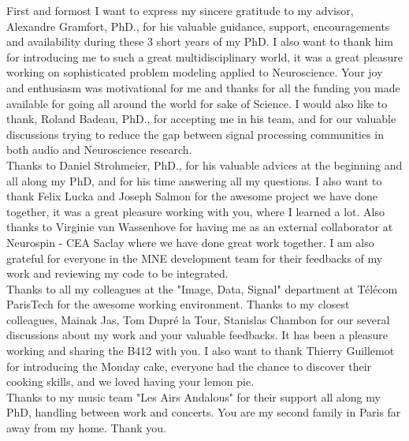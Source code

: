 
\begin{acknowledgements}
\addchaptertocentry{\acknowledgementname} %

\vspace{20pt}
First and formost I want to express my sincere gratitude to my advisor, Alexandre Gramfort, PhD., for his valuable guidance, support, encouragements and availability during these 3 short years of my PhD. I also want to thank him for introducing me to such a great multidisciplinary world, it was a great pleasure working on sophisticated problem modeling applied to Neuroscience. Your joy and enthusiasm was motivational for me and thanks for all the funding you made available for going all around the world for sake of Science. I would also like to thank, Roland Badeau, PhD., for accepting me in his team, and for our valuable discussions trying to reduce the gap between signal processing communities in both audio and Neuroscience research.\\

Thanks to Daniel Strohmeier, PhD., for his valuable advices at the beginning and all along my PhD, and for his time answering all my questions. I also want to thank Felix Lucka and Joseph Salmon for the awesome project we have done together, it was a great pleasure working with you, where I learned a lot. Also thanks to Virginie van Wassenhove for having me as an external collaborator at Neurospin - CEA Saclay where we have done great work together. I am also grateful for everyone in the MNE development team for their feedbacks of my work and reviewing my code to be integrated.
\\

Thanks to all my colleagues at the "Image, Data, Signal" department at Télécom ParisTech for the awesome working environment. Thanks to my closest colleagues, Mainak Jas, Tom Dupré la Tour, Stanislas Chambon for our several discussions about my work and your valuable feedbacks. It has been a pleasure working and sharing the B412 with you. I also want to thank Thierry Guillemot for introducing the Monday cake, everyone had the chance to discover their cooking skills, and we loved having your lemon pie.\\

Thanks to my music team "Les Airs Andalous" for their support all along my PhD, handling between work and concerts. You are my second family in Paris far away from my home. Thank you.\\


\end{acknowledgements}
